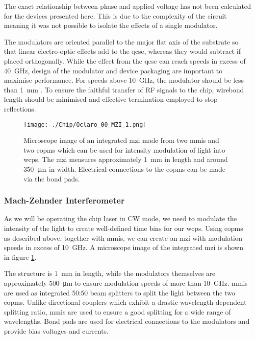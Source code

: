 \begin{parahigh}
The exact relationship between phase and applied voltage has not been calculated for the devices presented here. This is due to the complexity of the circuit meaning it was not possible to isolate the effects of a single modulator.
\end{parahigh}

The modulators are oriented parallel to the major flat axis of the substrate so that linear electro-optic effects add to the \ac{qcse}, whereas they would subtract if placed orthogonally. While the effect from the \ac{qcse} can reach speeds in excess of \SI{40}{GHz}, design of the modulator and device packaging are important to maximise performance. For speeds above \SI{10}{GHz}, the modulator should be less than \SI{1}{mm} \cite{smit2014}. To ensure the faithful transfer of RF signals to the chip, wirebond length should be minimised and effective termination employed to stop reflections.

\begin{figure}[tp]
	\centering
	\texttt{[image: ./Chip/Oclaro\_00\_MZI\_1.png]}
	\caption[Microscope image of an integrated Mach-Zehnder interferometer]{Microscope image of an  integrated \acl{mzi} made from two \acsp{mmi} and two \acsp{eopm} which can be used for intensity modulation of light into \acp{wcp}. The \ac{mzi} measures approximately \SI{1}{\mm} in length and around \SI{350}{\micro\metre} in width. Electrical connections to the \acsp{eopm} can be made via the bond pads.}
	\label{fig:InP_MZI}
\end{figure}

\subsubsection{Mach-Zehnder Interferometer}

As we will be operating the chip laser in \ac{CW} mode, we need to modulate the intensity of the light to create well-defined time bins for our \acp{wcp}. Using \acp{eopm} as described above, together with \acp{mmi}, we can create an \ac{mzi} with modulation speeds in excess of \SI{10}{GHz}. A microscope image of the integrated \ac{mzi} is shown in figure \ref{fig:InP_MZI}.

The structure is \SI{1}{mm} in length, while the modulators themselves are approximately \SI{500}{\um} to ensure modulation speeds of more than \SI{10}{GHz}. \Acp{mmi} are used as integrated {50:50} beam splitters to split the light between the two \acp{eopm}. Unlike directional couplers which exhibit a drastic wavelength-dependent splitting ratio, \acp{mmi} are used to ensure a good splitting for a wide range of wavelengths. Bond pads are used for electrical connections to the modulators and provide bias voltages and currents.

